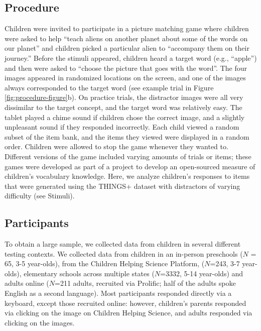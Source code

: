 \documentclass[
  man,floatsintext]{apa6}
\begin{document}
\subsection{Procedure}\label{procedure}

Children were invited to participate in a picture matching game where children were asked to help ``teach aliens on another planet about some of the words on our planet'' and children picked a particular alien to ``accompany them on their journey.'' Before the stimuli appeared, children heard a target word (e.g., ``apple'') and then were asked to ``choose the picture that goes with the word''. The four images appeared in randomized locations on the screen, and one of the images always corresponded to the target word (see example trial in Figure \ref{fig:procedure-figure}b). On practice trials, the distractor images were all very dissimilar to the target concept, and the target word was relatively easy. The tablet played a chime sound if children chose the correct image, and a slightly unpleasant sound if they responded incorrectly. Each child viewed a random subset of the item bank, and the items they viewed were displayed in a random order. Children were allowed to stop the game whenever they wanted to. Different versions of the game included varying amounts of trials or items; these games were developed as part of a project to develop an open-sourced measure of children's vocabulary knowledge. Here, we analyze children's responses to items that were generated using the THINGS+ dataset with distractors of varying difficulty (see Stimuli).

\subsection{Participants}\label{participants}

To obtain a large sample, we collected data from children in several different testing contexts. We collected data from children in an in-person preschools (\(N\) = 65, 3-5 year-olds), from the Children Helping Science Platform, (\(N\)=243, 3-7 year-olds), elementary schools across multiple states (\(N\)=3332, 5-14 year-olds) and adults online (\(N\)=211 adults, recruited via Prolific; half of the adults spoke English as a second language). Most participants responded directly via a keyboard, except those recruited online: however, children's parents responded via clicking on the image on Children Helping Science, and adults responded via clicking on the images.
\end{document}
